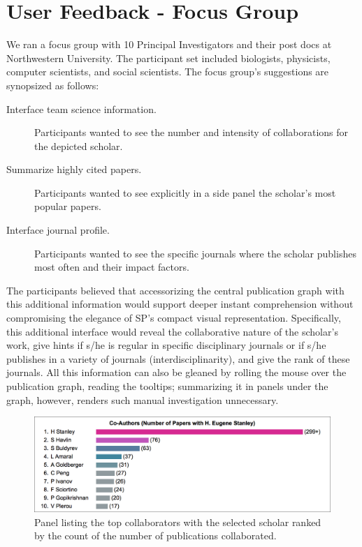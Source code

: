 \section{User Feedback - Focus Group}

We ran a focus group with 10  Principal Investigators and their post docs at Northwestern University. The participant set included biologists, physicists, computer scientists, and social scientists.  The focus group's suggestions are synopsized as follows:
\begin{description}
\item [Interface team science information.] Participants wanted to see the number and intensity of collaborations for the depicted scholar.
\item [Summarize highly cited papers.] Participants wanted to see explicitly in a side panel the scholar's most popular papers.
\item [Interface journal profile.] Participants wanted to see the specific journals where the scholar publishes most often and their impact factors.
\end{description}

The participants believed that accessorizing the central publication graph with this additional information would support deeper instant comprehension without compromising the elegance of SP's compact visual representation. Specifically, this additional interface would reveal the collaborative nature of the scholar's work, give hints if s/he is regular in specific disciplinary journals or if s/he publishes in a variety of journals (interdisciplinarity), and give the rank of these journals. All this information can also be gleaned by rolling the mouse over the publication graph, reading the tooltips; summarizing it in panels under the graph, however, renders such manual investigation unnecessary.

\begin{figure}[H]
    \centering
    \includegraphics[width=\textwidth]{figures/fig_panel1-N}
    \caption{Panel listing the top collaborators with the selected scholar ranked by the count of the number of publications collaborated.}
    \label{fig:panel1}
\end{figure}

